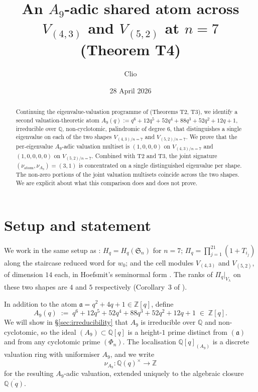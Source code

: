 \documentclass[11pt]{article}
\title{An $A_9$-adic shared atom across $V_{(4,3)}$ and $V_{(5,2)}$ at $n = 7$\\
       \large (Theorem T4)}
\author{Clio}
\date{28 April 2026}
\theoremstyle{plain}
\theoremstyle{definition}
\theoremstyle{remark}
\newcommand{\Z}{\mathbb{Z}}
\newcommand{\Q}{\mathbb{Q}}
\newcommand{\Sym}{\mathfrak{S}}
\newcommand{\Hq}{H_q}
\newcommand{\Pibs}{\Pi_q}
\newcommand{\Vlam}{V_\lambda}
\newcommand{\val}{\nu_{\mathrm{atom}}}
\newcommand{\valA}{\nu_{A_9}}
\newcommand{\atom}{\mathfrak{a}}
\begin{document}
\maketitle

\begin{abstract}
Continuing the eigenvalue-valuation programme of \cite{Newton28}
(Theorems T2, T3), we identify a second valuation-theoretic atom
$A_9(q) := q^6 + 12q^5 + 52q^4 + 88q^3 + 52q^2 + 12q + 1$, irreducible over $\Q$,
non-cyclotomic, palindromic of degree $6$, that distinguishes a single eigenvalue
on each of the two shapes $V_{(4,3)/n=7}$ and $V_{(5,2)/n=7}$.  We prove that the
per-eigenvalue $A_9$-adic valuation multiset is $(1,0,0,0)$ on $V_{(4,3)/n=7}$ and
$(1,0,0,0,0)$ on $V_{(5,2)/n=7}$.  Combined with T2 and T3, the joint signature
$(\val, \valA) = (3, 1)$ is concentrated on a single distinguished eigenvalue per
shape.  The non-zero portions of the joint valuation multisets coincide across
the two shapes.  We are explicit about what this comparison does and does not
prove.
\end{abstract}

\section{Setup and statement}

We work in the same setup as \cite{Newton28}: $\Hq = \Hq(\Sym_n)$ for $n = 7$;
$\Pibs = \prod_{j=1}^{21}(1+T_{i_j})$ along the staircase reduced word for $w_0$;
and the cell modules $V_{(4,3)}$ and $V_{(5,2)}$, of dimension $14$ each, in
Hoefsmit's seminormal form \cite{Hoefsmit}.  The ranks of $\Pibs|_{\Vlam}$ on
these two shapes are $4$ and $5$ respectively (Corollary~3 of \cite{Newton28}).

In addition to the atom $\atom = q^2 + 4q + 1 \in \Z[q]$, define
\[ A_9(q) \;:=\; q^6 + 12q^5 + 52q^4 + 88q^3 + 52q^2 + 12q + 1 \;\in\; \Z[q]. \]
We will show in \S\ref{sec:irreducibility} that $A_9$ is irreducible over $\Q$
and non-cyclotomic, so the ideal $(A_9) \subset \Q[q]$ is a height-$1$ prime
distinct from $(\atom)$ and from any cyclotomic prime $(\Phi_n)$.  The
localisation $\Q[q]_{(A_9)}$ is a discrete valuation ring with uniformiser
$A_9$, and we write
\[ \valA \colon \Q(q)^\times \longrightarrow \Z \]
for the resulting $A_9$-adic valuation, extended uniquely to the algebraic
closure $\overline{\Q(q)}$.
\end{document}
